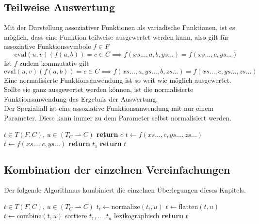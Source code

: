 \documentclass{scrartcl}
\begin{document}
\subsection{Teilweise Auswertung}
Mit der Darstellung assoziativer Funktionen als variadische Funktionen, ist es möglich, dass eine Funktion teilweise ausgewertet werden kann, also gilt für assoziative Funktionssymbole $f \in F$
$$\mathrm{eval}(u, v)(f(a, b)) = c \in C \implies f(xs..., a, b, ys...) = f(xs..., c, ys...)$$
Ist $f$ zudem kommutativ gilt 
$$\mathrm{eval}(u, v)(f(a, b)) = c \in C \implies f(xs..., a, ys..., b, zs...) = f(xs..., c, ys..., zs...)$$
Eine normalisierte Funktionsanwendung ist so weit wie möglich ausgewertet. Sollte sie ganz ausgewertet werden können, ist die normalisierte Funktionsanwendung das Ergebnis der Auswertung. \\
Der Spezialfall ist eine assoziative Funktionsanwendung mit nur einem Parameter. Diese kann immer zu dem Parameter selbst normalisiert werden.

\begin{algorithm}
\caption{$\mathrm{combine} \colon T \times (T_C \rightharpoonup C) \rightarrow T$}\label{combine}
\begin{algorithmic}[1] %
\Require $t \in T(F, C)$, $u \in (T_C \rightharpoonup C)$
	\State \textbf{return} $c$ 
			\State $t \leftarrow f(xs..., c, ys..., zs...)$
		\EndWhile
	\Else
			\State $t \leftarrow f(xs..., c, ys...)$
		\EndWhile
	\EndIf
		\State \textbf{return} $t_1$ 
	\EndIf
\EndIf
\State \textbf{return} $t$ 
\end{algorithmic}
\end{algorithm}

\subsection{Kombination der einzelnen Vereinfachungen}
Der folgende Algorithmus kombiniert die einzelnen Überlegungen dieses Kapitels. 

\begin{algorithm}
\caption{$\mathrm{normalize} \colon T \times (T_C \rightharpoonup C) \rightarrow T$}\label{normalize}
\begin{algorithmic}[1] %
\Require $t \in T(F, C)$, $u \in (T_C \rightharpoonup C)$
		\State $t_i \leftarrow \mathrm{normalize}(t_i, u)$
	\EndFor
\EndIf
\State $t \leftarrow \mathrm{flatten}(t, u)$
\State $t \leftarrow \mathrm{combine}(t, u)$
	\State sortiere $t_1, \dots, t_n$ lexikographisch
\EndIf
\State \textbf{return} $t$ 
\end{algorithmic}
\end{algorithm}
\end{document}

